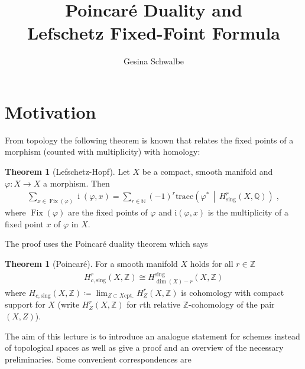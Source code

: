 \documentclass[english]{scrartcl}
\theoremstyle{definition}
\newtheorem{Thm}[Def]{Theorem}
\theoremstyle{remark}
\newcommand*{\N}{\mathds{N}}
\newcommand*{\Z}{\mathds{Z}}
\newcommand*{\Q}{\mathds{Q}}
\newcommand*{\trace}[2]{{\text{trace}\left(#1 \,\middle|\, #2 \right)}} %
\renewcommand*{\phi}{\varphi}
\begin{document}
\clearpairofpagestyles
{}
\cfoot*{\pagemark}

\title{Poincaré Duality and\\
  Lefschetz Fixed-Foint Formula}
\subject{Seminar:
  Deligne's proof of the Weil Conjecture%
}
\author{Gesina Schwalbe}
\maketitle
\tableofcontents

\section{Motivation}
From topology the following theorem is known that relates the fixed
points of a morphism (counted with multiplicity) with homology:
\begin{Thm}[Lefschetz-Hopf]
  Let $X$ be a compact, smooth manifold and
  $\phi\colon X\to X$ a morphism. Then
  \begin{gather*}
    \sum_{x\in\operatorname{Fix}(\phi)} \operatorname{i}(\phi,x)
    =\sum_{r\in\N}(-1)^r \trace{\phi^*}{H_\text{sing}^r(X,\Q)}\;,
  \end{gather*}
  where $\operatorname{Fix}(\phi)$ are the fixed points of $\phi$ and
  $\mathrm i(\phi,x)$ is the multiplicity of a fixed point $x$ of $\phi$
  in $X$.
\end{Thm}
The proof uses the Poincaré duality theorem which says
\begin{Thm}[Poincaré]
  For a smooth manifold $X$ holds for all $r\in\Z$
  \begin{gather*}
    H_{c,\text{sing}}^r(X,\Z) \cong H_{\dim(X)-r}^{\text{sing}}(X,\Z)
  \end{gather*}
  where $H_{c,\text{sing}}(X,\Z)\coloneqq
  \lim_{Z\subset X \text{cpt.}}H_Z^r(X,\Z)$
  is cohomology with compact support for $X$
  (write $H_Z^r(X,\Z)$ for $r$th relative $\Z$-cohomology of the pair $(X,Z)$).
\end{Thm}
The aim of this lecture is to introduce an analogue statement for
schemes instead of topological spaces as well as give a proof and an
overview of the necessary preliminaries.
Some convenient correspondences are
\end{document}
